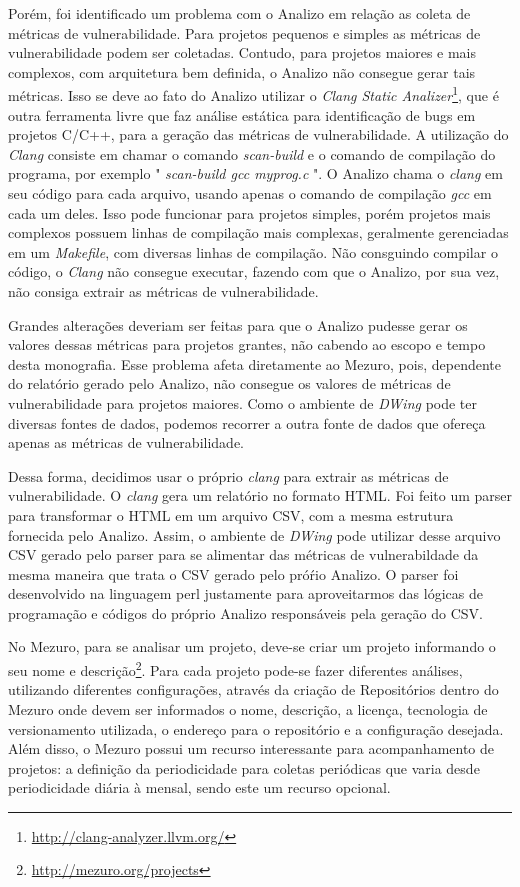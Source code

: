 Porém, foi identificado um problema com o Analizo em relação as coleta de métricas de vulnerabilidade. Para projetos pequenos e simples as métricas de vulnerabilidade podem ser coletadas.  Contudo, para projetos maiores e mais complexos, com arquitetura bem definida, o Analizo não consegue gerar tais métricas. Isso se deve ao fato do Analizo utilizar o \emph{Clang Static Analizer}\footnote{\url{http://clang-analyzer.llvm.org/}}, que é outra ferramenta livre que faz análise estática para identificação de bugs em projetos C/C++, para a geração das métricas de vulnerabilidade. A utilização do \emph{Clang} consiste em chamar o comando \emph{scan-build}  e o comando de compilação do programa, por exemplo " \emph{scan-build gcc myprog.c} ". O Analizo chama o \emph{clang} em seu código para cada arquivo, usando apenas o comando  de compilação \emph{gcc} em cada um deles. Isso pode funcionar para projetos simples, porém projetos mais complexos possuem linhas de compilação mais complexas, geralmente gerenciadas em um \emph{Makefile}, com diversas linhas de compilação. Não consguindo compilar o código, o \emph{Clang} não consegue executar, fazendo com que o Analizo, por sua vez, não consiga extrair as métricas de vulnerabilidade. 

Grandes alterações deveriam ser feitas para que o Analizo pudesse gerar os valores dessas métricas para projetos grantes, não cabendo ao escopo e tempo desta monografia. Esse problema afeta diretamente ao Mezuro, pois, dependente do relatório gerado pelo Analizo, não consegue os valores de métricas de vulnerabilidade para projetos maiores. Como o ambiente de \emph{DWing} pode ter diversas fontes de dados, podemos recorrer a outra fonte de dados que ofereça apenas as métricas de vulnerabilidade.

Dessa forma, decidimos usar o próprio  \emph{clang} para extrair as métricas de vulnerabilidade. O \emph{clang} gera um relatório no formato HTML. Foi feito um parser para transformar o HTML em um arquivo CSV, com a mesma estrutura fornecida pelo Analizo. Assim, o ambiente de \emph{DWing} pode utilizar desse arquivo CSV gerado pelo parser para se alimentar das métricas de vulnerabildade da mesma maneira que trata o CSV gerado pelo próŕio Analizo. O parser foi desenvolvido na linguagem perl justamente para aproveitarmos das lógicas de programação e códigos do próprio Analizo responsáveis pela geração do CSV.

No Mezuro, para se analisar um projeto, deve-se criar um projeto informando o seu nome e descrição\footnote{\url{http://mezuro.org/projects}}. Para cada projeto pode-se fazer diferentes análises, utilizando diferentes configurações, através da criação de Repositórios dentro do Mezuro onde devem ser informados o nome, descrição, a licença, tecnologia de versionamento utilizada, o endereço para o repositório e a configuração desejada. Além disso, o Mezuro possui um recurso interessante para acompanhamento de projetos: a definição da periodicidade para coletas periódicas que varia desde periodicidade diária à mensal, sendo este um recurso opcional.

